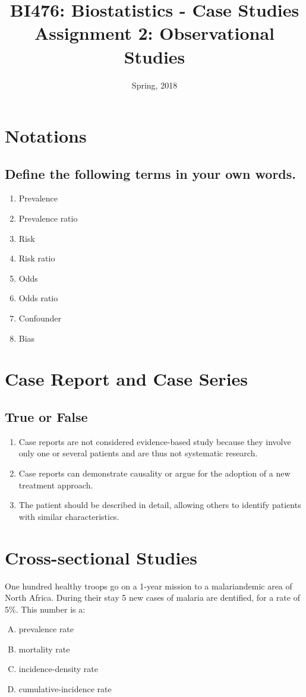 \documentclass[11pt,a4paper]{article}
\title{\small{BI476: Biostatistics - Case Studies}\\
\Large{Assignment 2: Observational Studies}
}
\author{}
\date{Spring, 2018}
\begin{document}
\begin{CJK*}{UTF8}{gbsn}
\maketitle


\section{Notations}
\subsection{Define the following terms in your own words.}
\begin{enumerate}[(1)]
	\item Prevalence
	\item Prevalence ratio
	\item Risk
	\item Risk ratio
	\item Odds
	\item Odds ratio
	\item Confounder
	\item Bias
\end{enumerate}

\section{Case Report and Case Series}
\subsection{True or False}
\begin{enumerate}[(1)]
	\item Case reports are not considered evidence-based study because 
		they involve only one or several patients and are thus not 
		systematic research.
	\item Case reports can demonstrate causality or argue for the adoption 
		of a new treatment approach.
	\item The patient should be described in detail, allowing others to 
		identify patients with similar characteristics.
\end{enumerate}


\section{Cross-sectional Studies}
One hundred healthy troops go on a 1-year mission to a malariandemic area of North Africa. 
During their stay 5 new cases of malaria are dentified, for a rate of 5\%. This number is a:
\begin{enumerate}[(A)]
	\item prevalence rate
	\item mortality rate
	\item incidence-density rate
	\item cumulative-incidence rate
\end{enumerate}


\end{CJK*}
\end{document}
